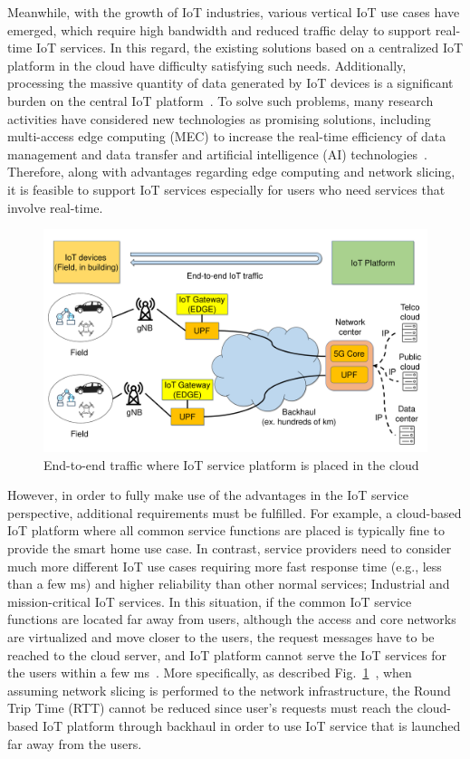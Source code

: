Meanwhile, with the growth of IoT industries, various vertical IoT use cases have emerged, which require high bandwidth and reduced traffic delay to support real-time IoT services. In this regard, the existing solutions based on a centralized IoT platform in the cloud have difficulty satisfying such needs. Additionally, processing the massive quantity of data generated by IoT devices is a significant burden on the central IoT platform~\cite{chen2017enabling}. To solve such problems, many research activities have considered new technologies as promising solutions, including multi-access edge computing (MEC) to increase the real-time efficiency of data management and data transfer and artificial intelligence (AI) technologies~\cite{wang2018network}. Therefore, along with advantages regarding edge computing and network slicing, it is feasible to support IoT services especially for users who need services that involve real-time.

\begin{figure}[tb!]
\centering
\includegraphics[width=\textwidth]{figures/fig_issue_of_current_network_slicing.pdf}
\caption{End-to-end traffic where IoT service platform is placed in the cloud}
\label{fig:network_slicing_issue}
\end{figure}

However, in order to fully make use of the advantages in the IoT service perspective, additional requirements must be fulfilled. For example, a cloud-based IoT platform where all common service functions are placed is typically fine to provide the smart home use case. In contrast, service providers need to consider much more different IoT use cases requiring more fast response time (e.g., less than a few ms) and higher reliability than other normal services; Industrial and mission-critical IoT services. In this situation, if the common IoT service functions are located far away from users, although the access and core networks are virtualized and move closer to the users, the request messages have to be reached to the cloud server, and IoT platform cannot serve the IoT services for the users within a few ms~\cite{husain2018mobile}. More specifically, as described Fig.~\ref{fig:network_slicing_issue}~\cite{edge_iot_netmanias}, when assuming network slicing is performed to the network infrastructure, the Round Trip Time (RTT) cannot be reduced since user's requests must reach the cloud-based IoT platform through backhaul in order to use IoT service that is launched far away from the users.

